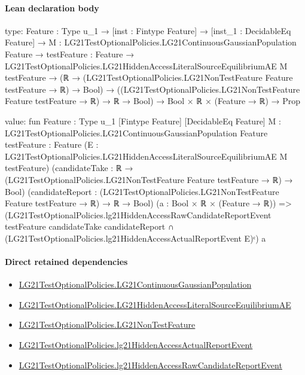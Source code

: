 \documentclass[10pt]{article}
\begin{document}
\paragraph{Lean declaration body}
\begin{ReviewVerbatim}
type:
{Feature : Type u_1} →
  [inst : Fintype Feature] →
    [inst_1 : DecidableEq Feature] →
      {M : LG21TestOptionalPolicies.LG21ContinuousGaussianPopulation Feature} →
        {testFeature : Feature} →
          LG21TestOptionalPolicies.LG21HiddenAccessLiteralSourceEquilibriumAE M testFeature →
            (ℝ → (LG21TestOptionalPolicies.LG21NonTestFeature Feature testFeature → ℝ) → Bool) →
              ((LG21TestOptionalPolicies.LG21NonTestFeature Feature testFeature → ℝ) → ℝ → Bool) →
                Bool × ℝ × (Feature → ℝ) → Prop

value:
fun {Feature : Type u_1} [Fintype Feature] [DecidableEq Feature]
    {M : LG21TestOptionalPolicies.LG21ContinuousGaussianPopulation Feature} {testFeature : Feature}
    (E : LG21TestOptionalPolicies.LG21HiddenAccessLiteralSourceEquilibriumAE M testFeature)
    (candidateTake : ℝ → (LG21TestOptionalPolicies.LG21NonTestFeature Feature testFeature → ℝ) → Bool)
    (candidateReport : (LG21TestOptionalPolicies.LG21NonTestFeature Feature testFeature → ℝ) → ℝ → Bool)
    (a : Bool × ℝ × (Feature → ℝ)) =>
  (LG21TestOptionalPolicies.lg21HiddenAccessRawCandidateReportEvent testFeature candidateTake candidateReport ∩
      (LG21TestOptionalPolicies.lg21HiddenAccessActualReportEvent E)ᶜ)
    a
\end{ReviewVerbatim}

\paragraph{Direct retained dependencies}
\begin{itemize}\raggedright
\item \hyperlink{paper-prerequisite-f5e1c886d250142b}{LG21\allowbreak{}Test\allowbreak{}Optional\allowbreak{}Policies.\allowbreak{}LG21\allowbreak{}Continuous\allowbreak{}Gaussian\allowbreak{}Population}
\item \hyperlink{governing-declaration-f111cafc341ec52d}{LG21\allowbreak{}Test\allowbreak{}Optional\allowbreak{}Policies.\allowbreak{}LG21\allowbreak{}Hidden\allowbreak{}Access\allowbreak{}Literal\allowbreak{}Source\allowbreak{}Equilibrium\allowbreak{}AE}
\item \hyperlink{governing-declaration-81cb73bf3869c56d}{LG21\allowbreak{}Test\allowbreak{}Optional\allowbreak{}Policies.\allowbreak{}LG21\allowbreak{}Non\allowbreak{}Test\allowbreak{}Feature}
\item \hyperlink{governing-declaration-fdcc75a7740f0e12}{LG21\allowbreak{}Test\allowbreak{}Optional\allowbreak{}Policies.\allowbreak{}lg21\allowbreak{}Hidden\allowbreak{}Access\allowbreak{}Actual\allowbreak{}Report\allowbreak{}Event}
\item \hyperlink{governing-declaration-4c74d9d193ce39dc}{LG21\allowbreak{}Test\allowbreak{}Optional\allowbreak{}Policies.\allowbreak{}lg21\allowbreak{}Hidden\allowbreak{}Access\allowbreak{}Raw\allowbreak{}Candidate\allowbreak{}Report\allowbreak{}Event}
\end{itemize}
\hypertarget{governing-declaration-de5bd154d0bff426}{}
\end{document}
